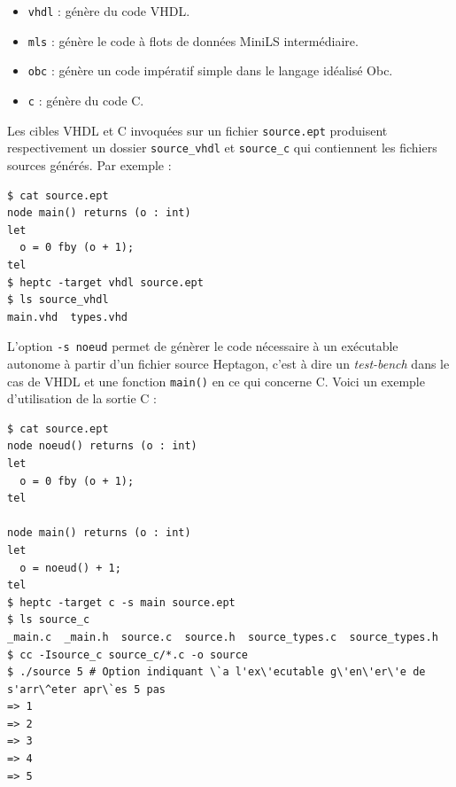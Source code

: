 \documentclass[a4paper]{article}
\newcommand{\LANG}{Heptagon}
\begin{document}
\begin{itemize}
\item \verb/vhdl/ : g\'en\`ere du code VHDL.
\item \verb/mls/ : g\'en\`ere le code \`a flots de donn\'ees MiniLS interm\'ediaire.
\item \verb/obc/ : g\'en\`ere un code imp\'eratif simple dans le langage id\'ealis\'e Obc.
\item \verb/c/ : g\'en\`ere du code C.
\end{itemize}

Les cibles VHDL et C invoqu\'ees sur un fichier \verb/source.ept/ produisent
respectivement un dossier \verb/source_vhdl/ et \verb/source_c/ qui contiennent
les fichiers sources g\'en\'er\'es. Par exemple :

\begin{verbatim}
$ cat source.ept
node main() returns (o : int)
let
  o = 0 fby (o + 1);
tel
$ heptc -target vhdl source.ept
$ ls source_vhdl
main.vhd  types.vhd
\end{verbatim}

L'option \verb/-s noeud/ permet de g\'en\`erer le code n\'ecessaire \`a un ex\'ecutable
autonome \`a partir d'un fichier source \LANG{}, c'est \`a dire un
\textit{test-bench} dans le cas de VHDL et une fonction \verb/main()/ en ce qui
concerne C. Voici un exemple d'utilisation de la sortie C :

\begin{verbatim}
$ cat source.ept
node noeud() returns (o : int)
let
  o = 0 fby (o + 1);
tel

node main() returns (o : int)
let
  o = noeud() + 1;
tel
$ heptc -target c -s main source.ept
$ ls source_c
_main.c  _main.h  source.c  source.h  source_types.c  source_types.h
$ cc -Isource_c source_c/*.c -o source
$ ./source 5 # Option indiquant \`a l'ex\'ecutable g\'en\'er\'e de s'arr\^eter apr\`es 5 pas
=> 1
=> 2
=> 3
=> 4
=> 5
\end{verbatim}



\end{document}

